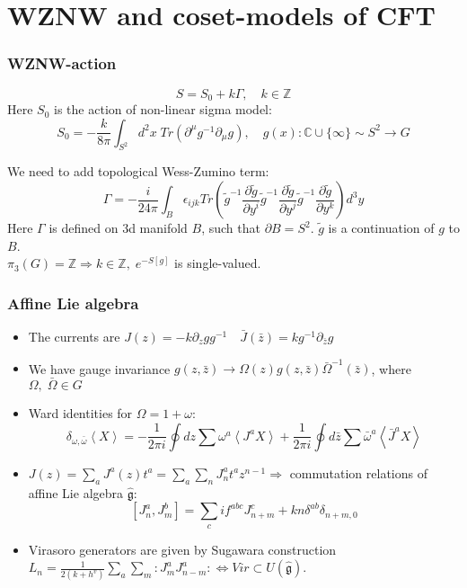 \documentclass[pdftex]{beamer}
\newcommand{\gfh}{\hat{\mathfrak{g}}}
\theoremstyle{definition} \newtheorem{Def}{Definition}
\begin{document}
\section{WZNW and coset-models of CFT }
\begin{frame}
  \frametitle{WZNW-action}
  \begin{equation}
    \label{eq:4}
    S=S_0+k\Gamma, \quad k\in \mathbb{Z}
  \end{equation}
Here $S_0$ is the action of non-linear sigma model:
\begin{equation}
  \label{eq:5}
  S_0=-\frac{k}{8\pi}\int_{S^2} d^2x\; Tr (\partial^{\mu}g^{-1}\partial_{\mu}g),\quad g(x):\mathbb{C}\cup \{\infty\}\sim S^{2}\to G 
\end{equation}

We need to add topological Wess-Zumino term:
\begin{equation}
  \label{eq:73}
\Gamma= - \frac{i }{24\pi} \int_{B}\epsilon_{ijk} Tr\left(
    \tilde g^{-1}\frac{\partial \tilde g}{\partial y^i}
      \tilde g^{-1}\frac{\partial \tilde g}{\partial y^j}
      \tilde g^{-1}\frac{\partial \tilde g}{\partial y^k}\right) d^3y
\end{equation}
Here $\Gamma$ is defined on 3d manifold $B$, such that $\partial B = S^{2}$. $\tilde{g}$ is a continuation of $g$ to $B$.\\
$\pi_{3}(G)=\mathbb{Z} \Rightarrow k\in\mathbb{Z}, \; e^{-S[g]}$ is single-valued.

\end{frame}
\begin{frame}
  \frametitle{Affine Lie algebra}

  \begin{itemize}
  \item   The currents are 
    $J(z)= -k \partial_zg g^{-1}\quad \bar J(\bar z)=k g^{-1}\partial_{\bar z}g$

  \item We have gauge invariance $   g(z,\bar z)\to \Omega(z)g(z,\bar z)\bar \Omega^{-1}(\bar z)$,
    where $\Omega,\;\bar \Omega \in G$

  \item Ward identities for $\Omega=1+\omega$:
    \begin{equation*}
      \label{eq:87}
      \delta_{\omega,\bar \omega}\left< X \right>=-\frac{1}{2\pi i}\oint dz \sum\omega^a \left< J^a X\right>+
      \frac{1}{2\pi i} \oint d\bar z \sum \bar \omega^a \left< \bar J^a X\right>
    \end{equation*}
  \item  $J(z)=\sum_{a} J^{a}(z) t^{a}=\sum_{a} \sum _{n} J^{a}_{n} t^{a} z^{n-1} \Rightarrow$ commutation relations of affine Lie algebra $\gfh$: 
    \begin{equation*}
      \left[J^a_n,J^b_m\right]=\sum_c i f^{abc}J^c_{n+m}+kn\delta^{ab}\delta_{n+m,0}
    \end{equation*}
  \item Virasoro generators are given by Sugawara construction $  L_n=\frac{1}{2(k+h^v)}\sum\limits_a\sum\limits_m:J^a_m J^a_{n-m}: \Leftrightarrow Vir\subset U(\gfh)$.
  \end{itemize}
\end{frame}
\end{document}
